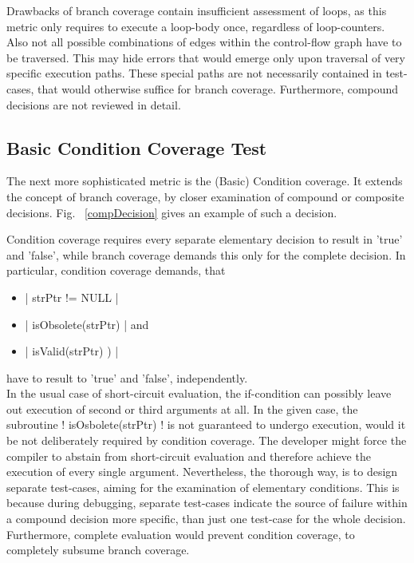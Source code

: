	Drawbacks of branch coverage contain insufficient assessment of loops, as this metric only requires to execute a loop-body once, regardless of loop-counters. Also not all possible combinations of edges within the control-flow graph have to be traversed. This may hide errors that would emerge only upon traversal of very specific execution paths. These special paths are not necessarily contained in test-cases, that would otherwise suffice for branch coverage. Furthermore, compound decisions are not reviewed in detail.
	\subsection{Basic Condition Coverage Test}
	The next more sophisticated metric is the (Basic) Condition coverage. It extends the concept of branch coverage, by closer examination of compound or composite decisions. Fig. ~\ref{compDecision} gives an example of such a decision. 
	
	
	Condition coverage requires every separate elementary decision to result in 'true' and 'false', while branch coverage demands this only for the complete decision. In particular, condition coverage demands, that 
	\begin{itemize} \setlength\itemsep{1px}
		\item \lstC |	strPtr != NULL 		|
		\item \lstC | 	isObsolete(strPtr)	| and
		\item \lstC | 	isValid(strPtr) )	|
	\end{itemize}
	have to result to 'true' and 'false', independently. \\

	In the usual case of short-circuit evaluation, the if-condition can possibly leave out execution of second or third arguments at all. In the given case, the subroutine \lstC ! isOsbolete(strPtr) ! is not guaranteed to undergo execution, would it be not deliberately required by condition coverage. The developer might force the compiler to abstain from short-circuit evaluation and therefore achieve the execution of every single argument. Nevertheless, the thorough way, is to design separate test-cases, aiming for the examination of elementary conditions. This is because during debugging, separate test-cases indicate the source of failure within a compound decision more specific, than just one test-case for the whole decision. Furthermore, complete evaluation would prevent condition coverage, to completely subsume branch coverage. \cite{Kalkov2013CodeCC}
		\cite{Tai1980ProgramTC}

